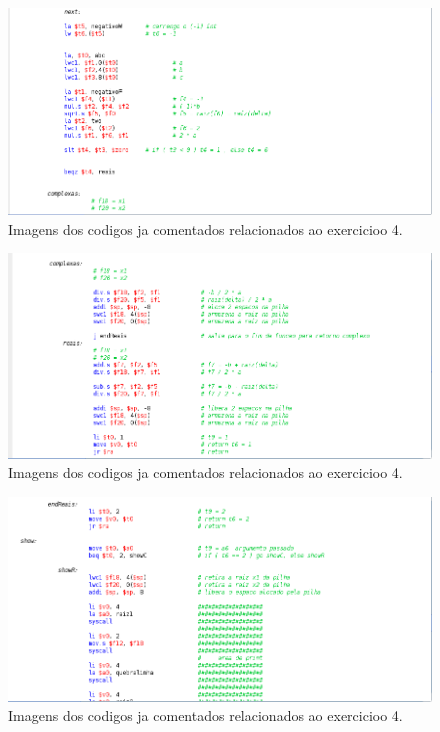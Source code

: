 \documentclass[12pt]{article}
\begin{document}
\begin{figure}[H]
	\centering
	\includegraphics[width=1\textwidth]{EX_4_6.png}
	\caption{Imagens dos codigos ja comentados relacionados ao exercicioo 4.}
	\label{fig:hilo}
\end{figure}

\begin{figure}[H]
	\centering
	\includegraphics[width=1\textwidth]{EX_4_7.png}
	\caption{Imagens dos codigos ja comentados relacionados ao exercicioo 4.}
	\label{fig:hilo}
\end{figure}

\begin{figure}[H]
	\centering
	\includegraphics[width=1\textwidth]{EX_4_8.png}
	\caption{Imagens dos codigos ja comentados relacionados ao exercicioo 4.}
	\label{fig:hilo}
\end{figure}
\end{document}
